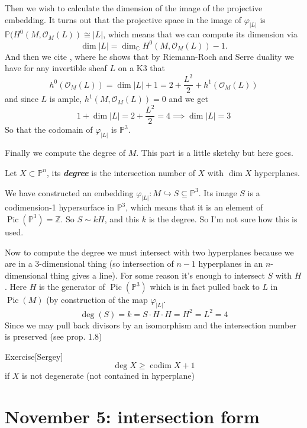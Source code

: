 Then we wish to calculate the dimension of the image of the projective embedding. It turns out that the projective space in the image of $\varphi_{|L|}$ is $\mathbb{P}(H^{0}(M,\mathcal{O}_M(L))\cong |L|$, which means that we can compute its dimension via
\[\dim |L| =\dim_{\mathbb{C}}H^{0}(M,\mathcal{O}_M(L))-1.\]
And then we cite \cite{saint-donat}, where he shows that by Riemann-Roch and Serre duality we have for any invertible sheaf $L$ on a K3 that
\[h^{0}(\mathcal{O}_M(L))=\dim |L| +1=2+\frac{L^2}{2}+h^{1}(\mathcal{O}_M(L))\]
and since $L$ is ample, $h^{1}(M,\mathcal{O}_M(L))=0$ and we get 
\[1+\dim |L| =2+\frac{L^2}{2}=4\implies \dim |L| =3\]
So that the codomain of $\varphi_{|L|}$ is $\mathbb{P}^{3}$.

Finally we compute the degree of $M$. {\color{6}This part is a little sketchy} but here goes.

\begin{defn}\leavevmode
	Let $X\subset \mathbb{P}^n$, its \textit{\textbf{degree}} is the intersection number of $X$ with $\dim X$ hyperplanes.
\end{defn}

We have constructed an embedding $\varphi_{|L|}:M\hookrightarrow S\subseteq \mathbb{P}^3$. Its image $S$ is a codimension-1 hypersurface in $\mathbb{P}^3$, which means that it is an element  of  $\operatorname{Pic}(\mathbb{P}^3) =\mathbb{Z}$. So $S \sim kH$, and this $k$ is the degree. {\color{6}So I'm not sure how this is used.}

Now to compute the degree we must intersect with two hyperplanes because we are in a 3-dimensional thing (so intersection of $n-1$ hyperplanes in an  $ n$-dimensional thing gives a line). {\color{6}For some reason} it's enough to intersect $S$ with $H$. Here $H$ is the generator of $\operatorname{Pic}(\mathbb{P}^3)$ which is in fact pulled back to $L$ in $\operatorname{Pic}(M)$ (by construction of the map $\varphi_{|L|}$.
\[\operatorname{deg}(S)=k=S\cdot H\cdot H=H^2=L^2=4\]
Since we may pull back divisors by an isomorphism and the intersection number is preserved (see \cite{beauville} prop. 1.8)

\begin{thing5}{Exercise}[Sergey]\leavevmode
	\[\operatorname{deg}X\geq \operatorname{codim}X+1\]
	if $X$ is not degenerate (not contained in hyperplane)
\end{thing5}

\section{November 5: intersection form}

